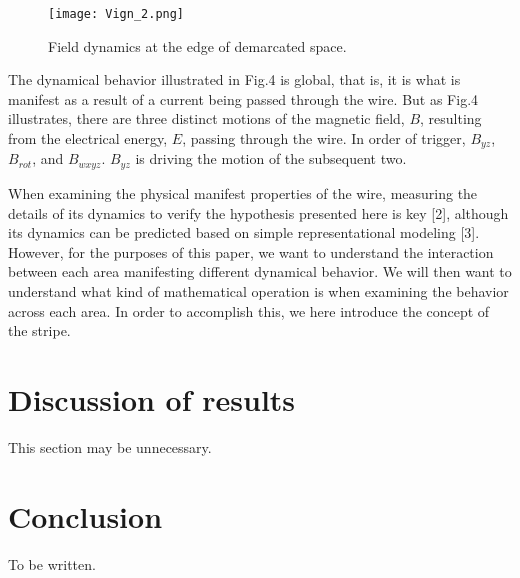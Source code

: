 \documentclass[]{article}
\begin{document}
\begin{figure}
  \texttt{[image: Vign\_2.png]}
  \caption{Field dynamics at the edge of demarcated space.}\label{fig:fig4}
\end{figure}

The dynamical behavior illustrated in Fig.4 is global, that is, it is what is manifest as a result of a current being passed through the wire. But as Fig.4 illustrates, there are three distinct motions of the magnetic field, $B$, resulting from the electrical energy, $E$, passing through the wire. In order of trigger, $B_{yz}$, $B_{rot}$, and $B_{wxyz}$. $B_{yz}$ is driving the motion of the subsequent two.

When examining the physical manifest properties of the wire, measuring the details of its dynamics to verify the hypothesis presented here is key [2], although its dynamics can be predicted based on simple representational modeling [3]. However, for the purposes of this paper, we want to understand the interaction between each area manifesting different dynamical behavior. We will then want to understand what kind of mathematical operation is when examining the behavior across each area. In order to accomplish this, we here introduce the concept of the stripe.

\section{Discussion of results}
This section may be unnecessary.

\section{Conclusion}
To be written.
\end{document}
